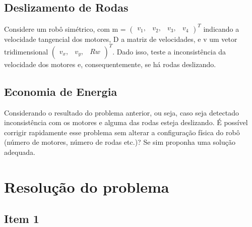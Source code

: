 \documentclass{article}
\begin{document}
\subsection{Deslizamento de Rodas}

Considere um robô simétrico, com m = $\begin{pmatrix}v_{1},&v_{2},&v_{3},&v_{4} \end{pmatrix}^T$ indicando a velocidade tangencial dos motores,
D a matriz de velocidades, e v um vetor tridimensional $\begin{pmatrix} v_{x},&v_{y},&Rw \end{pmatrix}^T$.
Dado isso, teste a inconsistência da velocidade dos motores e, consequentemente, se há rodas deslizando.

\subsection{Economia de Energia}

Considerando o resultado do problema anterior, ou seja, caso seja detectado inconsistência com os motores e alguma das rodas esteja deslizando.
É possível corrigir rapidamente esse problema sem alterar a configuração física do robô (número de motores, número de rodas etc.)? Se sim proponha uma solução adequada.

\section{Resolução do problema}
\subsection{Item 1}
\end{document}
